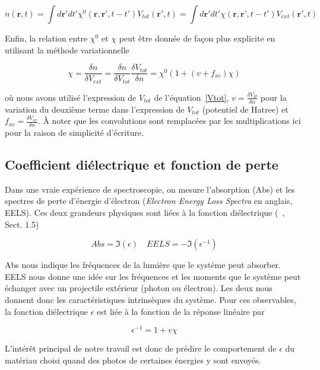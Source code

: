 \documentclass[12pt, french]{report}
\theoremstyle{theoreme}
\begin{document}
$$
n(\textbf{r}, t) = \int d\textbf{r}' dt' \chi^0(\textbf{r}, \textbf{r'}, t-t') V_{tot}(\textbf{r}', t) = \int d\textbf{r}' dt' \chi(\textbf{r}, \textbf{r'}, t-t') V_{ext}(\textbf{r}', t)
$$


Enfin, la relation entre $\chi^0$ et $\chi$ peut être donnée de façon plus explicite en utilisant la méthode variationnelle

\begin{equation}
  \label{eqn-chi0chi}
  \chi = \frac{\delta n}{\delta V_{ext}}
       = \frac{\delta n}{\delta V_{tot}} \frac{\delta V_{tot}}{\delta n}
       = \chi^0 ( 1 + (v+f_{xc})\chi)
\end{equation}

où nous avons utilisé l'expression de $V_{tot}$ de l'équation~\ref{Vtot}, $v = \frac{\delta V_H}{\delta n}$ pour la variation du deuxième terme dans l'expression de $V_{tot}$ (potentiel de Hatree) et $f_{xc} = \frac{\delta V_{xc}}{\delta n}$. À noter que les convolutions sont remplacées par les multiplications ici pour la raison de simplicité d'écriture.


\subsection{Coefficient diélectrique et fonction de perte}
\label{subsec-eels}
Dans une vraie expérience de spectroscopie, on mesure l'absorption (Abs) et les spectres de perte d'énergie d'électron (\textit{Electron Energy Loss Spectra} en anglais, EELS). Ces deux grandeurs physiques sont liées à la fonction diélectrique (~\cite{Sot03}, Sect. 1.5)

$$
Abs = \mathfrak{I}(\epsilon) \quad EELS = -\mathfrak{I}(\epsilon^{-1})
$$

Abs nous indique les fréquences de la lumière que le système peut absorber. EELS nous donne une idée sur les fréquences et les moments que le système peut échanger avec un projectile extérieur (photon ou électron). Les deux nous donnent donc les caractéristiques intrinsèques du système. Pour ces observables, la fonction diélectrique $\epsilon$ est liée à la fonction de la réponse linéaire par~\cite{Sot03}

\begin{equation}\label{epsilon}
  \epsilon^{-1} = 1+ v\chi
\end{equation}

L'intérêt principal de notre travail est donc de prédire le comportement de $\epsilon$ du matériau choisi quand des photos de certaines énergies y sont envoyés.
\end{document}

